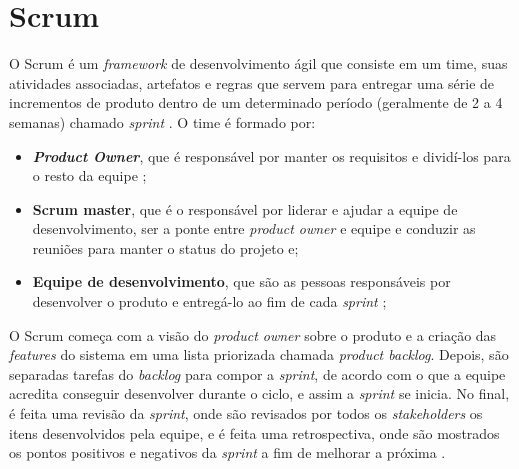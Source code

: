 \section{Scrum}

O Scrum é um \textit{framework} de desenvolvimento ágil que consiste em um time, suas atividades associadas, artefatos e regras que servem para entregar uma série de incrementos de produto dentro de um determinado período (geralmente de 2 a 4 semanas) chamado \textit{sprint} \cite{livro-scrum}.
O time é formado por:
\begin{itemize}
\item \textbf{\textit{Product Owner}}, que é responsável por manter os requisitos e dividí-los para o resto da equipe \cite{product-owner};
\item \textbf{Scrum master}, que é o responsável por liderar e ajudar a equipe de desenvolvimento, ser a ponte entre \textit{product owner} e equipe e conduzir as reuniões para manter o status do projeto \cite{scrum-master} e;
\item \textbf{Equipe de desenvolvimento}, que são as pessoas responsáveis por desenvolver o produto e entregá-lo ao fim de cada \textit{sprint} \cite{equipe-dev};
\end{itemize}
O Scrum começa com a visão do \textit{product owner} sobre o produto e a criação das \textit{features} do sistema em uma lista priorizada chamada \textit{product backlog}. Depois, são separadas tarefas do \textit{backlog} para compor a \textit{sprint}, de acordo com o que a equipe acredita conseguir desenvolver durante o ciclo, e assim a \textit{sprint} se inicia. No final, é feita uma revisão da \textit{sprint}, onde são revisados por todos os \textit{stakeholders} os itens desenvolvidos pela equipe, e é feita uma retrospectiva, onde são mostrados os pontos positivos e negativos da \textit{sprint} a fim de melhorar a próxima \cite{livro-scrum}.
